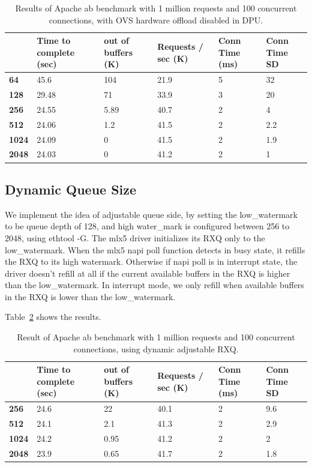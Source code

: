 \documentclass[letterpaper]{article}
\begin{document}
\begin{table}[h!]
\centering
\footnotesize
\begin{tabular}{|p{0.6cm}|p{1.2cm}|p{1.2cm}|p{1.2cm}|p{0.8cm}|p{1cm}|} \hline
\textbf{} & \textbf{Time to complete (sec)} & \textbf{out of buffers (K)} & \textbf{Requests / sec (K)} & \textbf{Conn Time (ms)} & \textbf{Conn Time SD} \\ \hline \hline
\textbf{64}   & 45.6  & 104   & 21.9 & 5 & 32  \\ \hline
\textbf{128}  & 29.48 & 71    & 33.9 & 3 & 20  \\ \hline \hline
\textbf{256}  & 24.55 & 5.89  & 40.7 & 2 & 4   \\ \hline
\textbf{512}  & 24.06 & 1.2   & 41.5 & 2 & 2.2 \\ \hline
\textbf{1024} & 24.09 & 0     & 41.5 & 2 & 1.9 \\ \hline
\textbf{2048} & 24.03 & 0     & 41.2 & 2 & 1   \\ \hline
\end{tabular}
\caption{Results of Apache ab benchmark with 1 million requests and 100 concurrent
connections, with OVS hardware offload disabled in DPU.}
\label{tab:ab1}
\end{table}


\subsection{Dynamic Queue Size}
We implement the idea of adjustable queue side, by setting the low\_watermark to
be queue depth of 128, and high water\_mark is configured between 256 to 2048, using
ethtool -G. The mlx5 driver initializes its RXQ only to the low\_watermark.
When the mlx5 napi poll function detects in busy state, it refills the
RXQ to its high watermark. Otherwise if napi poll is in interrupt state, the driver
doesn't refill at all if the current available buffers in the RXQ is higher than
the low\_watermark. In interrupt mode, we only refill when available buffers in the RXQ
is lower than the low\_watermark.

Table~\ref{tab:ab2} shows the results.
\begin{table}[h!]
\centering
\footnotesize
\begin{tabular}{|p{0.6cm}|p{1.2cm}|p{1.2cm}|p{1.2cm}|p{0.8cm}|p{1cm}|} \hline
\textbf{} & \textbf{Time to complete (sec)} & \textbf{out of buffers (K)} & \textbf{Requests / sec (K)} & \textbf{Conn Time (ms)} & \textbf{Conn Time SD} \\ \hline \hline
\textbf{256}  & 24.6  & 22   & 40.1 & 2 & 9.6 \\ \hline
\textbf{512}  & 24.1  & 2.1  & 41.3 & 2 & 2.9 \\ \hline
\textbf{1024} & 24.2  & 0.95   & 41.2 & 2 & 2   \\ \hline
\textbf{2048} & 23.9  & 0.65   & 41.7 & 2 & 1.8 \\ \hline
\end{tabular}
\caption{Result of Apache ab benchmark with 1 million requests and 100 concurrent connections, using dynamic adjustable RXQ.}
\label{tab:ab2}
\end{table}
\end{document}
